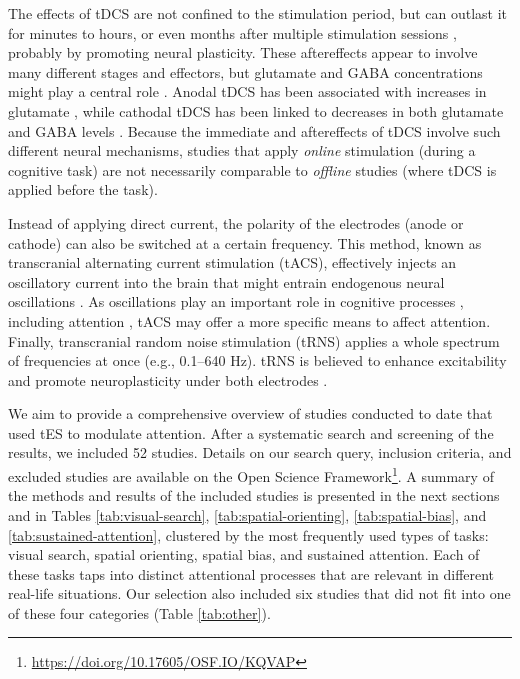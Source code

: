 \documentclass[11pt,english,]{memoir}
\let\rmarkdownfootnote\footnote%
\def\footnote{\protect\rmarkdownfootnote}
\renewcommand{\href}[2]{#2\footnote{\url{#1}}} %
\begin{document}
The effects of tDCS are not confined to the stimulation period, but can outlast it for minutes to hours, or even months after multiple stimulation sessions \autocite{Snowball2013}, probably by promoting neural plasticity. These aftereffects appear to involve many different stages and effectors, but glutamate and GABA concentrations might play a central role \autocite{Stagg2011b}. Anodal tDCS has been associated with increases in glutamate \autocites{Clark2011}{Hone-Blanchet2016}, while cathodal tDCS has been linked to decreases in both glutamate and GABA levels \autocite{Stagg2009}. Because the immediate and aftereffects of tDCS involve such different neural mechanisms, studies that apply \emph{online} stimulation (during a cognitive task) are not necessarily comparable to \emph{offline} studies (where tDCS is applied before the task).

Instead of applying direct current, the polarity of the electrodes (anode or cathode) can also be switched at a certain frequency. This method, known as transcranial alternating current stimulation (tACS), effectively injects an oscillatory current into the brain that might entrain endogenous neural oscillations \autocite{Herrmann2013}. As oscillations play an important role in cognitive processes \autocites{Buzsaki2004d}{Siegel2010c}, including attention \autocites{Buschman2007}{Womelsdorf2007}, tACS may offer a more specific means to affect attention. Finally, transcranial random noise stimulation (tRNS) applies a whole spectrum of frequencies at once (e.g., 0.1--640 Hz). tRNS is believed to enhance excitability and promote neuroplasticity under both electrodes \autocites{Antal2016}{Terney2008}.

We aim to provide a comprehensive overview of studies conducted to date that used tES to modulate attention. After a systematic search and screening of the results, we included 52 studies. Details on our search query, inclusion criteria, and excluded studies are available on the \href{https://doi.org/10.17605/OSF.IO/KQVAP}{Open Science Framework}. A summary of the methods and results of the included studies is presented in the next sections and in Tables \ref{tab:visual-search}, \ref{tab:spatial-orienting}, \ref{tab:spatial-bias}, and \ref{tab:sustained-attention}, clustered by the most frequently used types of tasks: visual search, spatial orienting, spatial bias, and sustained attention. Each of these tasks taps into distinct attentional processes that are relevant in different real-life situations. Our selection also included six studies that did not fit into one of these four categories (Table \ref{tab:other}).
\end{document}
